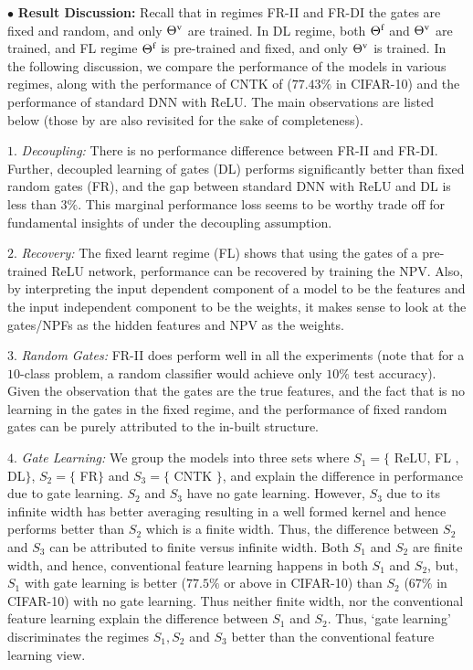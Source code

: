 
$\bullet$ \textbf{Result Discussion:}  Recall that in regimes FR-II and FR-DI the gates are fixed and random, and only ${\Theta}^{\text{v}}$ are trained. In DL regime, both $\Theta^{\textrm{f}}$ and ${\Theta}^{\text{v}}$ are trained, and FL regime $\Theta^{\textrm{f}}$ is pre-trained and fixed, and only ${\Theta}^{\text{v}}$ is trained. In the following discussion, we compare the performance of the models in various regimes, along with the performance of CNTK of \cite{arora2019exact} ($77.43\%$ in CIFAR-10) and the performance of standard DNN with ReLU.  The main observations are listed below (those by \cite{ch2020neural} are also revisited for the sake of completeness). 

\indent\quad $1.$ \emph{Decoupling:} There is no performance difference between FR-II and FR-DI.%
Further, decoupled learning of gates (DL) performs significantly better than fixed random gates (FR), and the gap between standard DNN with ReLU and DL is less than $3\%$. This marginal performance loss seems to be worthy trade off for fundamental insights of  under the decoupling assumption.


\indent\quad $2.$ \emph{Recovery:} The fixed learnt regime  (FL) shows that using the gates of a pre-trained ReLU network, performance can be recovered by training the NPV. Also, by interpreting the input dependent component of a model to be the features and the input independent component to be the weights, it makes sense to look at the gates/NPFs as the hidden features and NPV as the weights.%

\indent\quad $3.$ \emph{Random Gates:} FR-II does perform well in all the experiments (note that for a $10$-class problem, a random classifier would achieve only $10\%$ test accuracy). Given the observation that the gates are the true features, and the fact that is no learning in the gates in the fixed regime, and the performance of fixed random gates can be purely attributed to the in-built structure.

\indent\quad $4.$ \emph{Gate Learning:} We group the models into three sets where $S_1=\{$ ReLU, FL , DL$\}$, $S_2=\{$ FR$\}$ and $S_3=\{$ CNTK $\}$, and explain the difference in performance due to gate learning.
 $S_2$ and $S_3$ have no gate learning. However,  $S_3$ due to its infinite width has better averaging resulting in a well formed kernel and hence performs better than $S_2$ which is a finite width. Thus, the difference between $S_2$ and $S_3$ can be attributed to finite versus infinite width. Both $S_1$ and $S_2$ are finite width, and hence, conventional feature learning happens in both $S_1$ and $S_2$, but, $S_1$ with gate learning is better ($77.5\%$ or above in CIFAR-10) than $S_2$ ($67\%$ in CIFAR-10) with no gate learning. Thus neither finite width, nor the conventional feature learning explain the difference between $S_1$ and $S_2$. Thus, `gate learning' discriminates the regimes $S_1, S_2$ and $S_3$ better than the conventional feature learning view.

